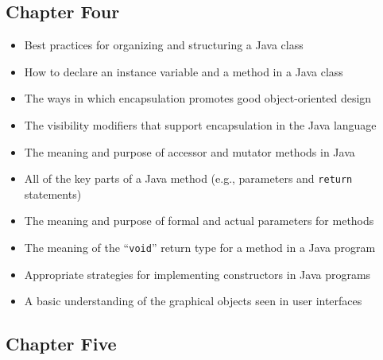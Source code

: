 \vspace*{-.25in}
\subsection*{Chapter Four}
\vspace*{-.1in}

\begin{itemize}

  \itemsep -.015in
  \item Best practices for organizing and structuring a Java class
  \item How to declare an instance variable and a method in a Java class
  \item The ways in which encapsulation promotes good object-oriented design
  \item The visibility modifiers that support encapsulation in the Java language
  \item The meaning and purpose of accessor and mutator methods in Java
  \item All of the key parts of a Java method (e.g., parameters and {\tt return} statements)
  \item The meaning and purpose of formal and actual parameters for methods
  \item The meaning of the ``{\tt void}'' return type for a method in a Java program
  \item Appropriate strategies for implementing constructors in Java programs
  \item A basic understanding of the graphical objects seen in user interfaces

\end{itemize}

\vspace*{-.2in}
\subsection*{Chapter Five}
\vspace*{-.05in}

